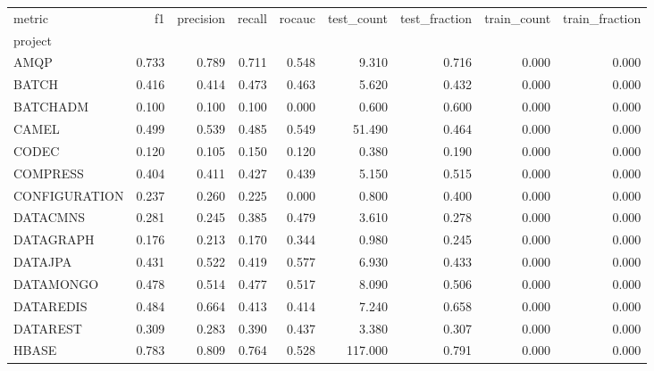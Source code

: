 \begin{tabular}{lrrrrrrrr}
\toprule
metric &    f1 &  precision &  recall &  rocauc &  test\_count &  test\_fraction &  train\_count &  train\_fraction \\
project       &       &            &         &         &             &                &              &                 \\
\midrule
AMQP          & 0.733 &      0.789 &   0.711 &   0.548 &       9.310 &          0.716 &        0.000 &           0.000 \\
BATCH         & 0.416 &      0.414 &   0.473 &   0.463 &       5.620 &          0.432 &        0.000 &           0.000 \\
BATCHADM      & 0.100 &      0.100 &   0.100 &   0.000 &       0.600 &          0.600 &        0.000 &           0.000 \\
CAMEL         & 0.499 &      0.539 &   0.485 &   0.549 &      51.490 &          0.464 &        0.000 &           0.000 \\
CODEC         & 0.120 &      0.105 &   0.150 &   0.120 &       0.380 &          0.190 &        0.000 &           0.000 \\
COMPRESS      & 0.404 &      0.411 &   0.427 &   0.439 &       5.150 &          0.515 &        0.000 &           0.000 \\
CONFIGURATION & 0.237 &      0.260 &   0.225 &   0.000 &       0.800 &          0.400 &        0.000 &           0.000 \\
DATACMNS      & 0.281 &      0.245 &   0.385 &   0.479 &       3.610 &          0.278 &        0.000 &           0.000 \\
DATAGRAPH     & 0.176 &      0.213 &   0.170 &   0.344 &       0.980 &          0.245 &        0.000 &           0.000 \\
DATAJPA       & 0.431 &      0.522 &   0.419 &   0.577 &       6.930 &          0.433 &        0.000 &           0.000 \\
DATAMONGO     & 0.478 &      0.514 &   0.477 &   0.517 &       8.090 &          0.506 &        0.000 &           0.000 \\
DATAREDIS     & 0.484 &      0.664 &   0.413 &   0.414 &       7.240 &          0.658 &        0.000 &           0.000 \\
DATAREST      & 0.309 &      0.283 &   0.390 &   0.437 &       3.380 &          0.307 &        0.000 &           0.000 \\
HBASE         & 0.783 &      0.809 &   0.764 &   0.528 &     117.000 &          0.791 &        0.000 &           0.000 \\

\end{tabular}
